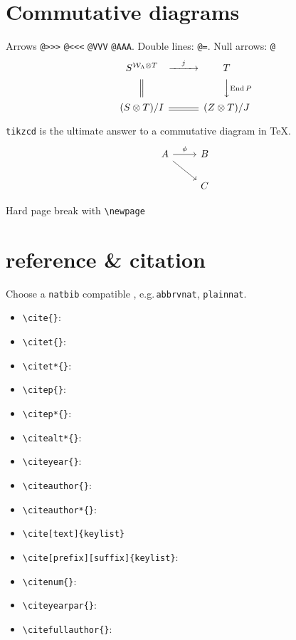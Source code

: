 \documentclass[a4paper,12pt]{amsart}
\theoremstyle{plain}
\theoremstyle{definition}
\theoremstyle{remark}
\numberwithin{equation}{section} %
\begin{document}
\section{Commutative diagrams}

Arrows \verb|@>>>| \verb|@<<<| \verb|@VVV| \verb|@AAA|. Double lines: \verb|@=|. Null arrows: \verb|@|
\begin{equation}\label{key}
	\begin{CD}
		S^{{\mathcal{W}}_{\Lambda}\otimes T} @>j>> T\\
		@|  @VV{\operatorname{End} P}V\\
		(S\otimes T)/I  @= (Z\otimes T)/J
	\end{CD}
\end{equation}


\verb|tikzcd| is the ultimate answer to a commutative diagram in \TeX.
\[ \begin{tikzcd}
		A \arrow[rd] \arrow[r, "\phi"] & B \\
		& C
	\end{tikzcd}  \]


Hard page break with \verb*|\newpage|

\newpage

\section{reference \& citation}
Choose a \verb*|natbib| compatible \verb||, e.g.\,\verb|abbrvnat|, \verb|plainnat|.
\begin{itemize}[$\cdot$]
	\item \verb*|\cite{}|: \cite{AkiyamaEtAl2020}
	\item \verb*|\citet{}|: \citet{AkiyamaEtAl2020}
	\item \verb*|\citet*{}|: \citet*{AkiyamaEtAl2020}
	\item \verb*|\citep{}|: \citep{AkiyamaEtAl2020}
	\item \verb*|\citep*{}|: \citep*{AkiyamaEtAl2020}
	\item \verb*|\citealt*{}|: \citealt*{AkiyamaEtAl2020}
	\item \verb*|\citeyear{}|: \citeyear{AkiyamaEtAl2020}
	\item \verb*|\citeauthor{}|: \citeauthor{AkiyamaEtAl2020}
	\item \verb*|\citeauthor*{}|: \citeauthor*{AkiyamaEtAl2020}
	\item \verb*|\cite[text]{keylist}| \cite[Theorem 1]{AkiyamaEtAl2020}
	\item \verb*|\cite[prefix][suffix]{keylist}|: \cite[see e.g.\!][p.\,123]{AkiyamaEtAl2020}
	\item \verb*|\citenum{}|: 
	\item \verb*|\citeyearpar{}|: \citeyearpar{AkiyamaEtAl2020}
	\item \verb*|\citefullauthor{}|: 
\end{itemize}
\end{document}
